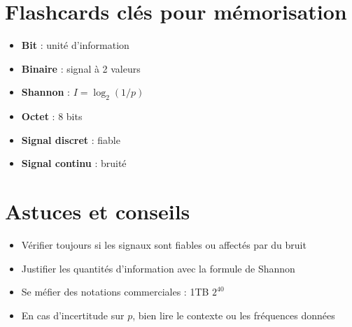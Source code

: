 \documentclass[12pt,a4paper]{article}
\begin{document}
\section{Flashcards clés pour mémorisation}
\begin{multicols}{2}
\begin{itemize}
  \item \textbf{Bit} : unité d’information
  \item \textbf{Binaire} : signal à 2 valeurs
  \item \textbf{Shannon} : $I = \log_2(1/p)$
  \item \textbf{Octet} : 8 bits
  \item \textbf{Signal discret} : fiable
  \item \textbf{Signal continu} : bruité
\end{itemize}
\end{multicols}

\section{Astuces et conseils}
\begin{itemize}
  \item Vérifier toujours si les signaux sont fiables ou affectés par du bruit
  \item Justifier les quantités d’information avec la formule de Shannon
  \item Se méfier des notations commerciales : 1TB \neq{} $2^{40}$
  \item En cas d'incertitude sur $p$, bien lire le contexte ou les fréquences données
\end{itemize}
\end{document}

